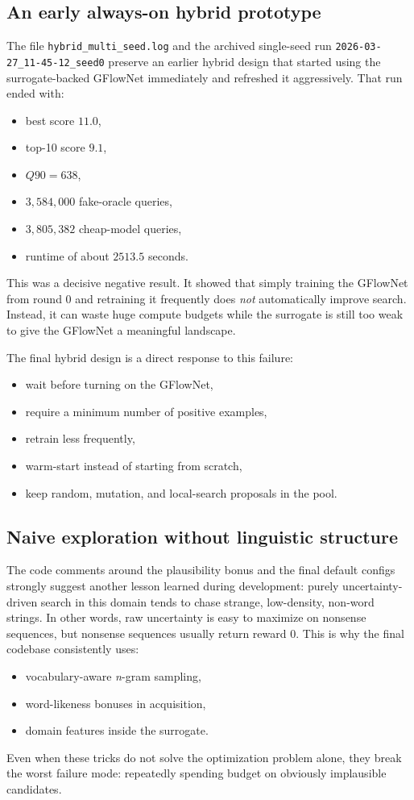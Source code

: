 \documentclass[10pt]{article}
\begin{document}
\subsection{An early always-on hybrid prototype}
The file \texttt{hybrid\_multi\_seed.log} and the archived single-seed run \texttt{2026-03-27\_11-45-12\_seed0} preserve an earlier hybrid design that started using the surrogate-backed GFlowNet immediately and refreshed it aggressively. That run ended with:
\begin{itemize}
    \item best score \(11.0\),
    \item top-10 score \(9.1\),
    \item \(Q90 = 638\),
    \item \(3{,}584{,}000\) fake-oracle queries,
    \item \(3{,}805{,}382\) cheap-model queries,
    \item runtime of about \(2513.5\) seconds.
\end{itemize}

This was a decisive negative result. It showed that simply training the GFlowNet from round \(0\) and retraining it frequently does \emph{not} automatically improve search. Instead, it can waste huge compute budgets while the surrogate is still too weak to give the GFlowNet a meaningful landscape.

The final hybrid design is a direct response to this failure:
\begin{itemize}
    \item wait before turning on the GFlowNet,
    \item require a minimum number of positive examples,
    \item retrain less frequently,
    \item warm-start instead of starting from scratch,
    \item keep random, mutation, and local-search proposals in the pool.
\end{itemize}

\subsection{Naive exploration without linguistic structure}
The code comments around the plausibility bonus and the final default configs strongly suggest another lesson learned during development: purely uncertainty-driven search in this domain tends to chase strange, low-density, non-word strings. In other words, raw uncertainty is easy to maximize on nonsense sequences, but nonsense sequences usually return reward \(0\). This is why the final codebase consistently uses:
\begin{itemize}
    \item vocabulary-aware \emph{n}-gram sampling,
    \item word-likeness bonuses in acquisition,
    \item domain features inside the surrogate.
\end{itemize}
Even when these tricks do not solve the optimization problem alone, they break the worst failure mode: repeatedly spending budget on obviously implausible candidates.
\end{document}
